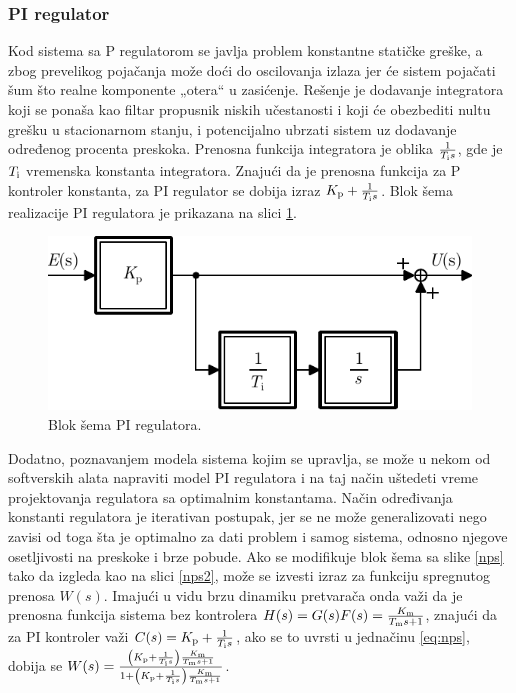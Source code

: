 \documentclass[a4paper, 12pt, diplomski]{etf}
\newcommand{\navod}[1]{„#1“}
\begin{document}
\subsubsection{PI regulator} \label{s:PI}

Kod sistema sa P regulatorom se javlja problem konstantne statičke greške, a zbog prevelikog pojačanja može doći do oscilovanja izlaza jer će sistem pojačati šum što realne komponente \navod{otera} u zasićenje. Rešenje je dodavanje integratora koji se ponaša kao filtar propusnik niskih učestanosti i koji će obezbediti nultu grešku u stacionarnom stanju, i potencijalno ubrzati sistem uz dodavanje određenog procenta preskoka. Prenosna funkcija integratora je oblika $\frac{1}{T_{\rm i}s}$, gde je $T_{\rm i}$ vremenska konstanta integratora. Znajući da je prenosna funkcija za P kontroler konstanta, za PI regulator se dobija izraz $K_{\rm p} + \frac{1}{T_{\rm i}s}$. Blok šema realizacije PI regulatora je prikazana na slici \ref{PIreg}.


\begin{figure}[h!]
    \centering
    \includegraphics[scale=1]{fig/PIreg.pdf}
    \caption{Blok šema PI regulatora.}
    \label{PIreg}
\end{figure}

Dodatno, poznavanjem modela sistema kojim se upravlja, se može u nekom od softverskih alata napraviti model PI regulatora i na taj način uštedeti vreme projektovanja regulatora sa optimalnim konstantama. Način određivanja konstanti regulatora je iterativan postupak, jer se ne može generalizovati nego zavisi od toga šta je optimalno za dati problem i samog sistema, odnosno njegove osetljivosti na preskoke i brze pobude.
Ako se modifikuje blok šema sa slike \ref{nps} tako da izgleda kao na slici \ref{nps2}, može se izvesti izraz za funkciju spregnutog prenosa $W(s)$. Imajući u vidu brzu dinamiku pretvarača onda važi da je prenosna funkcija sistema bez kontrolera $H(s) = G(s)F(s) = \frac{K_{\rm m}}{T_{\rm m}s + 1}$, znajući da za PI kontroler važi $C(s) = K_{\rm p} + \frac{1}{T_{\rm i}s}$, ako se to uvrsti u jednačinu \eqref{eq:nps}, dobija se $W(s) = \frac{\left( K_{\rm p} + \frac{1}{T_{\rm i}s} \right) \frac{K_{\rm m}}{T_{\rm m}s + 1} }{ 1 + \left( K_{\rm p} + \frac{1}{T_{\rm i}s} \right) \frac{K_{\rm m}}{T_{\rm m}s + 1} }$. \cite{osuREG}
\end{document}
